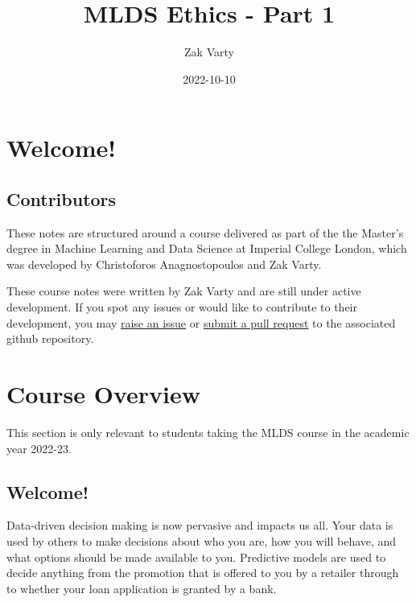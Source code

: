 \documentclass[
]{book}
\title{MLDS Ethics - Part 1}
\author{Zak Varty}
\date{2022-10-10}
\theoremstyle{definition}
\theoremstyle{definition}
\theoremstyle{definition}
\theoremstyle{definition}
\theoremstyle{remark}
\begin{document}
\maketitle

{
\setcounter{tocdepth}{1}
\tableofcontents
}
\hypertarget{welcome}{%
\chapter*{Welcome!}\label{welcome}}

\hypertarget{contributors}{%
\section*{Contributors}\label{contributors}}

These notes are structured around a course delivered as part of the the Master's degree in Machine Learning and Data Science at Imperial College London, which was developed by Christoforos Anagnostopoulos and Zak Varty.

These course notes were written by Zak Varty and are still under active development. If you spot any issues or would like to contribute to their development, you may \href{https://github.com/zakvarty/ethics-1/issues}{raise an issue} or \href{https://github.com/zakvarty/ethics-1/pulls}{submit a pull request} to the associated github repository.

\hypertarget{course-overview}{%
\chapter*{Course Overview}\label{course-overview}}

This section is only relevant to students taking the MLDS course in the
academic year 2022-23.

\hypertarget{welcome-1}{%
\section{Welcome!}\label{welcome-1}}

Data-driven decision making is now pervasive and impacts us all. Your
data is used by others to make decisions about who you are, how you will
behave, and what options should be made available to you. Predictive
models are used to decide anything from the promotion that is offered to
you by a retailer through to whether your loan application is granted by
a bank.
\end{document}
